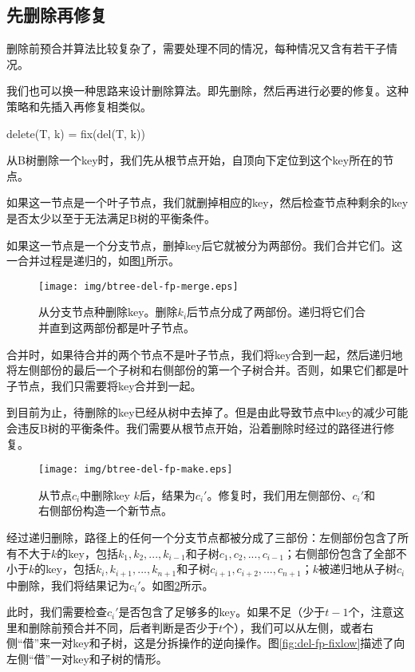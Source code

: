 \documentclass{ctexart}
\begin{document}
\subsection{先删除再修复}

删除前预合并算法比较复杂了，需要处理不同的情况，每种情况又含有若干子情况。

我们也可以换一种思路来设计删除算法。即先删除，然后再进行必要的修复。这种策略和先插入再修复相类似。

\be
delete(T, k) = fix(del(T, k))
\ee

从B树删除一个key时，我们先从根节点开始，自顶向下定位到这个key所在的节点。

如果这一节点是一个叶子节点，我们就删掉相应的key，然后检查节点种剩余的key是否太少以至于无法满足B树的平衡条件。

如果这一节点是一个分支节点，删掉key后它就被分为两部份。我们合并它们。这一合并过程是递归的，如图\ref{fig:del-fp-merge}所示。

\begin{figure}[htbp]
  \centering
  \texttt{[image: img/btree-del-fp-merge.eps]}
  \caption{从分支节点种删除key。删除$k_i$后节点分成了两部份。递归将它们合并直到这两部份都是叶子节点。} \label{fig:del-fp-merge}
\end{figure}

合并时，如果待合并的两个节点不是叶子节点，我们将key合到一起，然后递归地将左侧部份的最后一个子树和右侧部份的第一个子树合并。否则，如果它们都是叶子节点，我们只需要将key合并到一起。

到目前为止，待删除的key已经从树中去掉了。但是由此导致节点中key的减少可能会违反B树的平衡条件。我们需要从根节点开始，沿着删除时经过的路径进行修复。

\begin{figure}[htbp]
  \centering
  \texttt{[image: img/btree-del-fp-make.eps]}
  \caption{从节点$c_i$中删除key $k$后，结果为$c_i'$。修复时，我们用左侧部份、$c_i'$和右侧部份构造一个新节点。}
  \label{fig:del-fp-make}
\end{figure}

经过递归删除，路径上的任何一个分支节点都被分成了三部份：左侧部份包含了所有不大于$k$的key，包括$k_1, k_2, ..., k_{i-1}$和子树$c_1, c_2, ..., c_{i-1}$；右侧部份包含了全部不小于$k$的key，包括$k_i, k_{i+1}, ..., k_{n+1}$和子树$c_{i+1}, c_{i+2}, ..., c_{n+1}$；$k$被递归地从子树$c_i$中删除，我们将结果记为$c_i'$。如图\ref{fig:del-fp-make}所示。

此时，我们需要检查$c_i'$是否包含了足够多的key。如果不足（少于$t-1$个，注意这里和删除前预合并不同，后者判断是否少于$t$个），我们可以从左侧，或者右侧“借”来一对key和子树，这是分拆操作的逆向操作。图\ref{fig:del-fp-fixlow}描述了向左侧“借”一对key和子树的情形。
\end{document}
